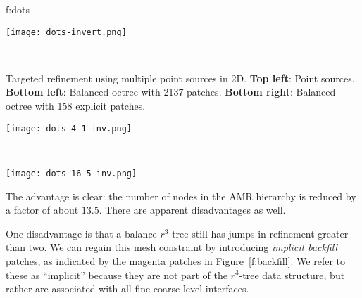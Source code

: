 \documentclass[10pt,twocolumn]{article}
\begin{document}
{f:dots}{
\begin{minipage}{3.2in}
\begin{minipage}{1.5in}
\texttt{[image: dots-invert.png]}
\end{minipage} \ 
\begin{minipage}{1.5in}
\small Targeted refinement using multiple point sources in 2D.
\textbf{Top left}: Point sources.  
\textbf{Bottom left}: Balanced octree with 2137 patches.
\textbf{Bottom right}: Balanced octree with 158 explicit patches.
\end{minipage}
\begin{minipage}{1.5in}
\texttt{[image: dots-4-1-inv.png]}
\end{minipage} \ 
\begin{minipage}{1.5in}
\texttt{[image: dots-16-5-inv.png]}
\end{minipage}
\end{minipage}}


The advantage is clear: the number of nodes in the AMR hierarchy is
reduced by a factor of about $13.5$.  There are apparent disadvantages
as well.

One disadvantage is that a balance $r^3$-tree still has jumps in
refinement greater than two.  We can regain this mesh constraint by
introducing \textit{implicit backfill} patches, as indicated by the
magenta patches in Figure~\ref{f:backfill}.  We refer to these as
``implicit'' because they are not part of the $r^3$-tree data
structure, but rather are associated with all fine-coarse level
interfaces.
\end{document}
